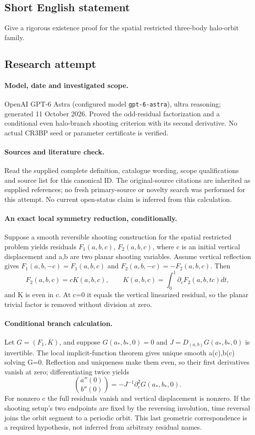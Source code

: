 \documentclass[11pt]{article}
\begin{document}
\subsection{Short English statement}
Give a rigorous existence proof for the spatial restricted three-body halo-orbit family.
\subsection{Research attempt}
\paragraph{Model, date and investigated scope.}
OpenAI GPT-6 Astra (configured model \texttt{gpt-6-astra}), ultra reasoning; generated 11 October 2026. Proved the odd-residual factorization and a conditional even halo-branch shooting criterion with its second derivative. No actual CR3BP seed or parameter certificate is verified.

\paragraph{Sources and literature check.}
Read the supplied complete definition, catalogue wording, scope qualifications and source list for this canonical ID. The original-source citations are inherited as supplied references; no fresh primary-source or novelty search was performed for this attempt. No current open-status claim is inferred from this calculation.

\paragraph{An exact local symmetry reduction, conditionally.}Suppose a smooth reversible shooting construction for the spatial restricted problem yields residuals \(F_1(a,b,c)\), \(F_2(a,b,c)\), where c is an initial vertical displacement and a,b are two planar shooting variables. Assume vertical reflection gives \(F_1(a,b,-c)=F_1(a,b,c)\) and \(F_2(a,b,-c)=-F_2(a,b,c)\). Then
\[F_2(a,b,c)=cK(a,b,c),\qquad K(a,b,c)=\int_0^1\partial_cF_2(a,b,tc)dt,
\]
and K is even in c. At c=0 it equals the vertical linearized residual, so the planar trivial factor is removed without division at zero.
\paragraph{Conditional branch calculation.}Let \(G=(F_1,K)\), and suppose \(G(a_*,b_*,0)=0\) and \(J=D_{(a,b)}G(a_*,b_*,0)\) is invertible. The local implicit-function theorem gives unique smooth a(c),b(c) solving G=0. Reflection and uniqueness make them even, so their first derivatives vanish at zero; differentiating twice yields
\[\binom{a''(0)}{b''(0)}=-J^{-1}\partial_c^2G(a_*,b_*,0).
\]
For nonzero c the full residuals vanish and vertical displacement is nonzero. If the shooting setup's two endpoints are fixed by the reversing involution, time reversal joins the orbit segment to a periodic orbit. This last geometric correspondence is a required hypothesis, not inferred from arbitrary residual names.
\end{document}
